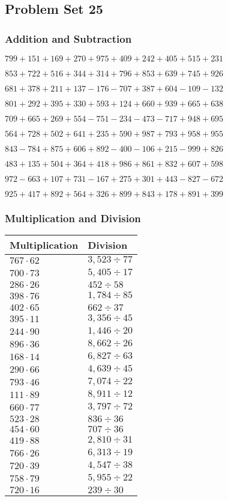 \hypertarget{problem-set-25-2}{%
\subsection{Problem Set 25}\label{problem-set-25-2}}

\hypertarget{addition-and-subtraction-125}{%
\subsubsection{Addition and
Subtraction}\label{addition-and-subtraction-125}}

\(799 + 151 + 169 + 270 + 975 + 409 + 242 + 405 + 515 + 231\)

\(853 + 722 + 516 + 344 + 314 + 796 + 853 + 639 + 745 + 926\)

\(681 + 378 + 211 + 137 - 176 - 707 + 387 + 604 - 109 - 132\)

\(801 + 292 + 395 + 330 + 593 + 124 + 660 + 939 + 665 + 638\)

\(709 + 665 + 269 + 554 - 751 - 234 - 473 - 717 + 948 + 695\)

\(564 + 728 + 502 + 641 + 235 + 590 + 987 + 793 + 958 + 955\)

\(843 - 784 + 875 + 606 + 892 - 400 - 106 + 215 - 999 + 826\)

\(483 + 135 + 504 + 364 + 418 + 986 + 861 + 832 + 607 + 598\)

\(972 - 663 + 107 + 731 - 167 + 275 + 301 + 443 - 827 - 672\)

\(925 + 417 + 892 + 564 + 326 + 899 + 843 + 178 + 891 + 399\)

\hypertarget{multiplication-and-division-125}{%
\subsubsection{Multiplication and
Division}\label{multiplication-and-division-125}}

\begin{longtable}[]{@{}ll@{}}
\toprule
Multiplication & Division\tabularnewline
\midrule
\endhead
\(767 \cdot 62\) & \(3,523÷77\)\tabularnewline
\(700 \cdot 73\) & \(5,405÷17\)\tabularnewline
\(286 \cdot 26\) & \(452÷58\)\tabularnewline
\(398 \cdot 76\) & \(1,784÷85\)\tabularnewline
\(402 \cdot 65\) & \(662÷37\)\tabularnewline
\(395 \cdot 11\) & \(3,356÷45\)\tabularnewline
\(244 \cdot 90\) & \(1,446÷20\)\tabularnewline
\(896 \cdot 36\) & \(8,662÷26\)\tabularnewline
\(168 \cdot 14\) & \(6,827÷63\)\tabularnewline
\(290 \cdot 66\) & \(4,639÷45\)\tabularnewline
\(793 \cdot 46\) & \(7,074÷22\)\tabularnewline
\(111 \cdot 89\) & \(8,911÷12\)\tabularnewline
\(660 \cdot 77\) & \(3,797÷72\)\tabularnewline
\(523 \cdot 28\) & \(836÷36\)\tabularnewline
\(454 \cdot 60\) & \(707÷36\)\tabularnewline
\(419 \cdot 88\) & \(2,810 ÷31\)\tabularnewline
\(766 \cdot 26\) & \(6,313÷19\)\tabularnewline
\(720 \cdot 39\) & \(4,547÷38\)\tabularnewline
\(758 \cdot 79\) & \(5,955÷22\)\tabularnewline
\(720 \cdot 16\) & \(239÷30\)\tabularnewline
\bottomrule
\end{longtable}

